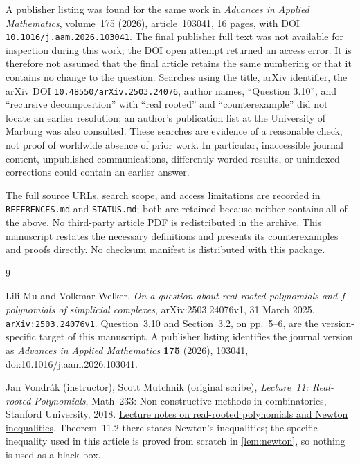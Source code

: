\documentclass[11pt,letterpaper]{article}
\numberwithin{equation}{section}
\theoremstyle{definition}
\theoremstyle{remark}
\begin{document}
A publisher listing was found for the same work in \emph{Advances in
Applied Mathematics}, volume~175 (2026), article~103041, 16 pages, with DOI
\texttt{10.1016/j.aam.2026.103041}. The final publisher full text was not
available for inspection during this work; the DOI open attempt returned an
access error. It is therefore not assumed
that the final article retains the same numbering or that it contains no
change to the question. Searches using the title, arXiv identifier, the arXiv
DOI \texttt{10.48550/arXiv.2503.24076}, author names, ``Question 3.10'', and
``recursive decomposition'' with ``real rooted'' and ``counterexample'' did
not locate an earlier resolution; an author's publication list at the
University of Marburg was also consulted. These searches are evidence of a
reasonable check, not proof of worldwide absence of prior work. In particular,
inaccessible journal content, unpublished communications, differently worded
results, or unindexed corrections could contain an earlier answer.

The full source URLs, search scope, and access limitations are recorded in
\texttt{REFERENCES.md} and \texttt{STATUS.md}; both are retained because
neither contains all of the above. No third-party article PDF is redistributed
in the archive. This manuscript restates the necessary definitions and
presents its counterexamples and proofs directly. No checksum manifest is
distributed with this package.

\begin{thebibliography}{9}

Lili Mu and Volkmar Welker,
\emph{On a question about real rooted polynomials and $f$-polynomials of
simplicial complexes}, arXiv:2503.24076v1, 31 March 2025.
\href{https://arxiv.org/abs/2503.24076v1}{\texttt{arXiv:2503.24076v1}}.
Question~3.10 and Section~3.2, on pp.~5--6, are the version-specific target of
this manuscript. A publisher listing identifies the journal version as
\emph{Advances in Applied Mathematics} \textbf{175} (2026), 103041,
\href{https://doi.org/10.1016/j.aam.2026.103041}{doi:10.1016/j.aam.2026.103041}.

Jan Vondr\'ak (instructor), Scott Mutchnik (original scribe),
\emph{Lecture~11: Real-rooted Polynomials},
Math~233: Non-constructive methods in combinatorics,
Stanford University, 2018.
\href{https://theory.stanford.edu/~jvondrak/MATH233A-2018/Math233-lec11.pdf}
{Lecture notes on real-rooted polynomials and Newton inequalities}.
Theorem~11.2 there states Newton's inequalities; the specific inequality used
in this article is proved from scratch in \cref{lem:newton}, so nothing is
used as a black box.

\end{thebibliography}
\end{document}
